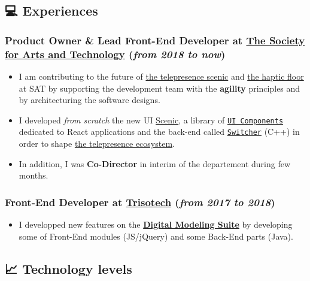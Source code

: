 \documentclass[11pt]{article}
\begin{document}
\subsection{💻 Experiences}
\label{sec:org22a2ff1}
\subsubsection{\textbf{Product Owner \& Lead Front-End Developer} at \href{https://sat.qc.ca/}{The Society for Arts and Technology} (\emph{from 2018 to now})}
\label{sec:org717956d}

\begin{itemize}
\item I am contributing to the future of \href{https://gitlab.com/sat-mtl/tools/scenic/scenic}{the telepresence scenic} and \href{https://gitlab.com/sat-mtl/tools/haptic-floor}{the haptic floor} at SAT by supporting the development team with the \textbf{agility} principles and by architecturing the software designs.
\item I developed \emph{from scratch} the new UI \href{https://gitlab.com/sat-mtl/tools/scenic/scenic}{Scenic}, a library of \href{https://gitlab.com/sat-mtl/tools/ui-components}{\texttt{UI Components}} dedicated to React applications and the back-end called \href{https://gitlab.com/sat-mtl/tools/switcher}{\texttt{Switcher}} (C++) in order to shape \href{https://telepresence-scenic.ca/}{the telepresence ecosystem}.
\item In addition, I was \textbf{Co-Director} in interim of the departement during few months.
\end{itemize}

\subsubsection{\textbf{Front-End Developer} at \href{https://www.trisotech.com/}{Trisotech} (\emph{from 2017 to 2018})}
\label{sec:orgfc179ea}

\begin{itemize}
\item I developped new features on the \href{https://www.trisotech.com/digital-modeling-suite/}{\textbf{Digital Modeling Suite}} by developing some of Front-End modules (JS/jQuery) and some Back-End parts (Java).
\end{itemize}

\subsection{📈 Technology levels}
\label{sec:org99fced7}
\end{document}

